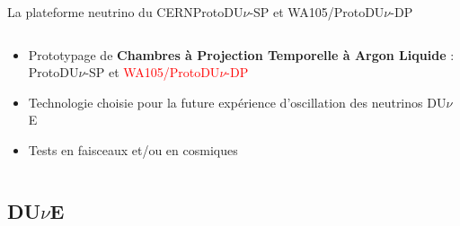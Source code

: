 \begin{frame}{La plateforme neutrino du CERN}{ProtoDU$\nu$-SP et WA105/ProtoDU$\nu$-DP}
\begin{columns}
\begin{column}{0.5\textwidth}
\begin{scriptsize}
\begin{itemize}
                        \item Prototypage de \textbf{Chambres à Projection Temporelle à Argon Liquide} : ProtoDU$\nu$-SP et \textcolor{red}{WA105/ProtoDU$\nu$-DP}
                        \item Technologie choisie pour la future expérience d'oscillation des neutrinos DU$\nu$E
                        \item Tests en faisceaux et/ou en cosmiques
                    \end{itemize}
                \end{scriptsize}
            \end{column}
        \end{columns}
    \end{frame}
        
    \subsection{DU$\nu$E}
        
